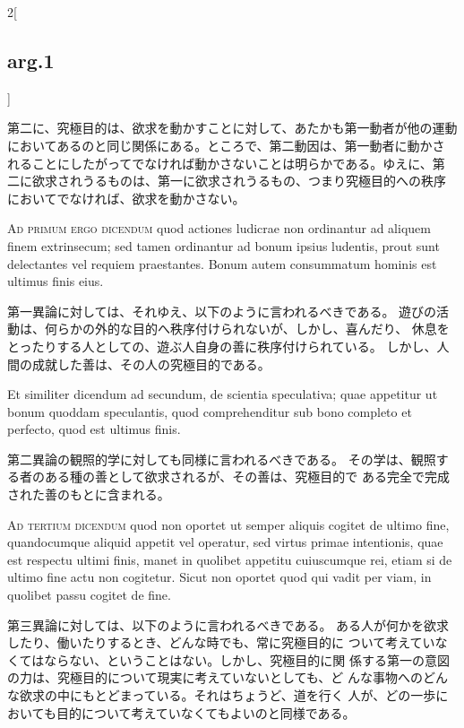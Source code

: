\documentclass[paper=a4paper,fontsize=10pt,jafontsize=9pt,titlepage]{jlreq}
\begin{document}
\begin{paracol}{2}[\subsection{arg.1}]
\switchcolumn

第二に、究極目的は、欲求を動かすことに対して、あたかも第一動者が他の運動
 においてあるのと同じ関係にある。ところで、第二動因は、第一動者に動かさ
 れることにしたがってでなければ動かさないことは明らかである。ゆえに、第
 二に欲求されうるものは、第一に欲求されうるもの、つまり究極目的への秩序
 においてでなければ、欲求を動かさない。

\switchcolumn*[\subsection{ad.1}]

{\scshape Ad primum ergo dicendum} quod actiones
ludicrae non ordinantur ad aliquem finem extrinsecum; sed tamen
ordinantur ad bonum ipsius ludentis, prout sunt delectantes vel requiem
praestantes. Bonum autem consummatum hominis est ultimus finis eius.

\switchcolumn

第一異論に対しては、それゆえ、以下のように言われるべきである。
遊びの活動は、何らかの外的な目的へ秩序付けられないが、しかし、喜んだり、
 休息をとったりする人としての、遊ぶ人自身の善に秩序付けられている。
しかし、人間の成就した善は、その人の究極目的である。

\switchcolumn*

Et similiter dicendum ad secundum, de
scientia speculativa; quae appetitur ut bonum quoddam speculantis, quod
comprehenditur sub bono completo et perfecto, quod est ultimus finis.

\switchcolumn

第二異論の観照的学に対しても同様に言われるべきである。
その学は、観照する者のある種の善として欲求されるが、その善は、究極目的で
 ある完全で完成された善のもとに含まれる。

\switchcolumn*[\subsection{ad.3}]

{\scshape Ad tertium dicendum} quod non oportet ut
semper aliquis cogitet de ultimo fine, quandocumque aliquid appetit vel
operatur, sed virtus primae intentionis, quae est respectu ultimi finis,
manet in quolibet appetitu cuiuscumque rei, etiam si de ultimo fine actu
non cogitetur. Sicut non oportet quod qui vadit per viam, in quolibet
passu cogitet de fine.

\switchcolumn

第三異論に対しては、以下のように言われるべきである。
ある人が何かを欲求したり、働いたりするとき、どんな時でも、常に究極目的に
 ついて考えていなくてはならない、ということはない。しかし、究極目的に関
 係する第一の意図の力は、究極目的について現実に考えていないとしても、ど
 んな事物へのどんな欲求の中にもとどまっている。それはちょうど、道を行く
 人が、どの一歩においても目的について考えていなくてもよいのと同様である。

\end{paracol}
\newpage
\end{document}
